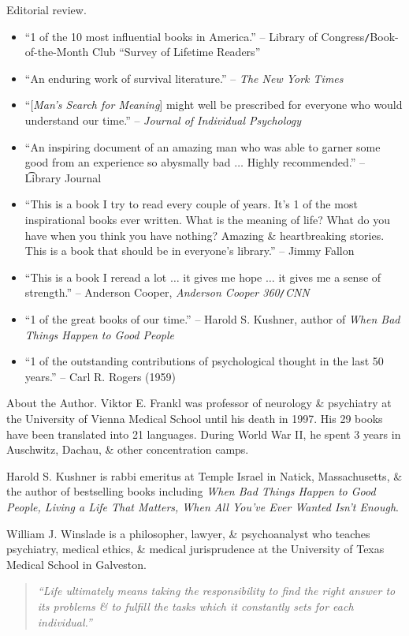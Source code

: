 \documentclass{article}
\begin{document}
\begin{enumerate}
	{\sf Editorial review.}
	\begin{itemize}
		\item ``1 of the 10 most influential books in America.'' -- Library of Congress{\tt/}Book-of-the-Month Club ``Survey of Lifetime Readers''
		\item ``An enduring work of survival literature.'' -- {\it The New York Times}
		\item ``[{\it Man's Search for Meaning}] might well be prescribed for everyone who would understand our time.'' -- {\it Journal of Individual Psychology}
		\item ``An inspiring document of an amazing man who was able to garner some good from an experience so abysmally bad $\ldots$ Highly recommended.'' -- {\t Library Journal}
		\item ``This is a book I try to read every couple of years. It's 1 of the most inspirational books ever written. What is the meaning of life? What do you have when you think you have nothing? Amazing \& heartbreaking stories. This is a book that should be in everyone's library.'' -- {\sc Jimmy Fallon}
		\item ``This is a book I reread a lot $\ldots$ it gives me hope $\ldots$ it gives me a sense of strength.'' -- {\sf Anderson Cooper}, {\it Anderson Cooper 360{\tt/}CNN}
		\item ``1 of the great books of our time.'' -- {\sc Harold S. Kushner}, author of {\it When Bad Things Happen to Good People}
		\item ``1 of the outstanding contributions of psychological thought in the last 50 years.'' -- {\sc Carl R. Rogers} (1959)
	\end{itemize}
	{\sf About the Author.} {\sc Viktor E. Frankl} was professor of neurology \& psychiatry at the University of Vienna Medical School until his death in 1997. His 29 books have been translated into 21 languages. During World War II, he spent 3 years in Auschwitz, Dachau, \& other concentration camps.
	
	{\sc Harold S. Kushner} is rabbi emeritus at Temple Israel in Natick, Massachusetts, \& the author of bestselling books including {\it When Bad Things Happen to Good People, Living a Life That Matters, When All You've Ever Wanted Isn't Enough}.
	
	{\sc William J. Winslade} is a philosopher, lawyer, \& psychoanalyst who teaches psychiatry, medical ethics, \& medical jurisprudence at the University of Texas Medical School in Galveston.
	\begin{quotation}
		{\it``Life ultimately means taking the responsibility to find the right answer to its problems \& to fulfill the tasks which it constantly sets for each individual.''}
		

\end{quotation}
\end{enumerate}
\end{document}
